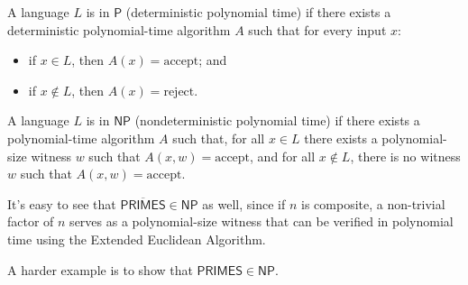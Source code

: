 \begin{definition}
    A language \(L\) is in \(\mathsf{P}\) (deterministic polynomial time) if there exists a deterministic polynomial-time algorithm \(A\) such that for every input \(x\):
    \begin{itemize}
        \item if \(x \in L\), then \(A(x) = \text{accept}\); and
        \item if \(x \notin L\), then \(A(x) = \text{reject}\).
    \end{itemize}
\end{definition}

\begin{definition}
    A language \(L\) is in \(\mathsf{NP}\) (nondeterministic polynomial time) if there exists a polynomial-time algorithm \(A\) such that, for all \(x \in L\) there exists a polynomial-size witness \(w\) such that \(A(x, w) = \text{accept}\), and for all \(x \notin L\), there is no witness \(w\) such that \(A(x, w) = \text{accept}\).
\end{definition}

It's easy to see that \(\overline{\mathsf{PRIMES}} \in \mathsf{NP}\) as well, since if \(n\) is composite, a non-trivial factor of \(n\) serves as a polynomial-size witness that can be verified in polynomial time using the Extended Euclidean Algorithm.

A harder example is to show that \(\mathsf{PRIMES} \in \mathsf{NP}\).